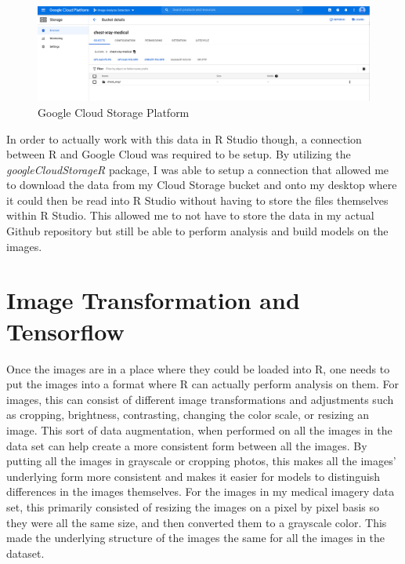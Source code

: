 \documentclass[12pt]{article}
\begin{document}
\begin{figure}

{\centering \includegraphics[width=0.75\linewidth,height=0.25\textheight]{images/cloud_storage} 

}

\caption{Google Cloud Storage Platform}\label{fig:sample-fig2}
\end{figure}

In order to actually work with this data in R Studio though, a
connection between R and Google Cloud was required to be setup. By
utilizing the \emph{googleCloudStorageR} package, I was able to setup a
connection that allowed me to download the data from my Cloud Storage
bucket and onto my desktop where it could then be read into R Studio
without having to store the files themselves within R Studio. This
allowed me to not have to store the data in my actual Github repository
but still be able to perform analysis and build models on the images.

\hypertarget{image-transformation-and-tensorflow}{%
\section{Image Transformation and
Tensorflow}\label{image-transformation-and-tensorflow}}

Once the images are in a place where they could be loaded into R, one
needs to put the images into a format where R can actually perform
analysis on them. For images, this can consist of different image
transformations and adjustments such as cropping, brightness,
contrasting, changing the color scale, or resizing an image. This sort
of data augmentation, when performed on all the images in the data set
can help create a more consistent form between all the images. By
putting all the images in grayscale or cropping photos, this makes all
the images' underlying form more consistent and makes it easier for
models to distinguish differences in the images themselves. For the
images in my medical imagery data set, this primarily consisted of
resizing the images on a pixel by pixel basis so they were all the same
size, and then converted them to a grayscale color. This made the
underlying structure of the images the same for all the images in the
dataset.
\end{document}
